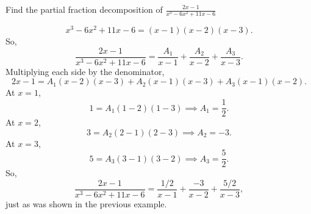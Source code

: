 \begin{example}
	Find the partial fraction decomposition of $\frac{2x-1}{x^3-6x^2+11x-6}$
\end{example}
\begin{equation*}
	x^3-6x^2+11x-6 = (x-1)(x-2)(x-3).
\end{equation*}
So,
\begin{equation*}
	\frac{2x-1}{x^3-6x^2+11x-6} = \frac{A_1}{x-1}+\frac{A_2}{x-2}+\frac{A_3}{x-3}.
\end{equation*}
Multiplying each side by the denominator,
\begin{equation*}
	2x-1 = A_1(x-2)(x-3)+A_2(x-1)(x-3)+A_3(x-1)(x-2).
\end{equation*}
At $x=1$,
\begin{equation*}
	1 = A_1(1-2)(1-3) \implies A_1 = \frac{1}{2}.
\end{equation*}
At $x=2$,
\begin{equation*}
	3 = A_2(2-1)(2-3) \implies A_2 = -3.
\end{equation*}
At $x=3$,
\begin{equation*}
	5 = A_3(3-1)(3-2) \implies A_3 = \frac{5}{2}.
\end{equation*}
So,
\begin{equation*}
	\frac{2x-1}{x^3-6x^2+11x-6} = \frac{1/2}{x-1} + \frac{-3}{x-2} + \frac{5/2}{x-3},
\end{equation*}
just as was shown in the previous example.